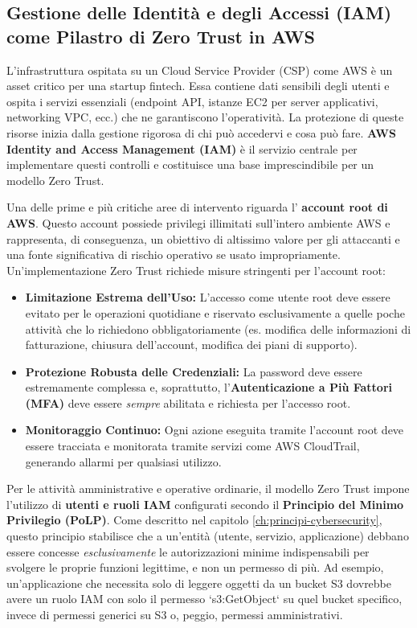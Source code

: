 \subsection{Gestione delle Identità e degli Accessi (IAM) come Pilastro di Zero Trust in AWS}
\label{subsec:iam-zero-trust}

L'infrastruttura ospitata su un Cloud Service Provider (CSP) come AWS è un asset critico per una startup fintech. Essa contiene dati sensibili degli utenti e ospita i servizi essenziali (endpoint API, istanze EC2 per server applicativi, networking VPC, ecc.) che ne garantiscono l'operatività. La protezione di queste risorse inizia dalla gestione rigorosa di chi può accedervi e cosa può fare. \textbf{AWS Identity and Access Management (IAM)} è il servizio centrale per implementare questi controlli e costituisce una base imprescindibile per un modello Zero Trust.

Una delle prime e più critiche aree di intervento riguarda l' \textbf{account root di AWS}. Questo account possiede privilegi illimitati sull'intero ambiente AWS e rappresenta, di conseguenza, un obiettivo di altissimo valore per gli attaccanti e una fonte significativa di rischio operativo se usato impropriamente. Un'implementazione Zero Trust richiede misure stringenti per l'account root:
\begin{itemize}
    \item \textbf{Limitazione Estrema dell'Uso:} L'accesso come utente root deve essere evitato per le operazioni quotidiane e riservato esclusivamente a quelle poche attività che lo richiedono obbligatoriamente (es. modifica delle informazioni di fatturazione, chiusura dell'account, modifica dei piani di supporto).
    \item \textbf{Protezione Robusta delle Credenziali:} La password deve essere estremamente complessa e, soprattutto, l'\textbf{Autenticazione a Più Fattori (MFA)} deve essere \textit{sempre} abilitata e richiesta per l'accesso root.
    \item \textbf{Monitoraggio Continuo:} Ogni azione eseguita tramite l'account root deve essere tracciata e monitorata tramite servizi come AWS CloudTrail, generando allarmi per qualsiasi utilizzo.
\end{itemize}

Per le attività amministrative e operative ordinarie, il modello Zero Trust impone l'utilizzo di \textbf{utenti e ruoli IAM} configurati secondo il \textbf{Principio del Minimo Privilegio (PoLP)}. Come descritto nel capitolo \ref{ch:principi-cybersecurity}, questo principio stabilisce che a un'entità (utente, servizio, applicazione) debbano essere concesse \textit{esclusivamente} le autorizzazioni minime indispensabili per svolgere le proprie funzioni legittime, e non un permesso di più. Ad esempio, un'applicazione che necessita solo di leggere oggetti da un bucket S3 dovrebbe avere un ruolo IAM con solo il permesso `s3:GetObject` su quel bucket specifico, invece di permessi generici su S3 o, peggio, permessi amministrativi.


